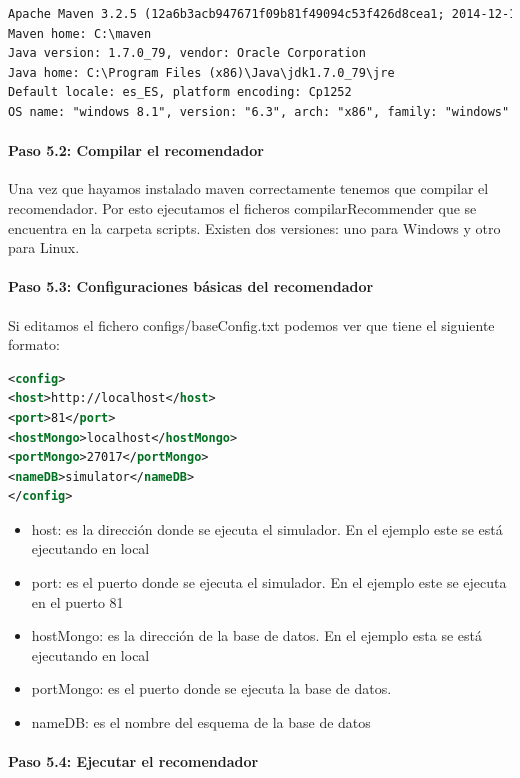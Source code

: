 \begin{lstlisting}[language=xml, frame=single]
Apache Maven 3.2.5 (12a6b3acb947671f09b81f49094c53f426d8cea1; 2014-12-14T18:29:23+01:00)
Maven home: C:\maven
Java version: 1.7.0_79, vendor: Oracle Corporation
Java home: C:\Program Files (x86)\Java\jdk1.7.0_79\jre
Default locale: es_ES, platform encoding: Cp1252
OS name: "windows 8.1", version: "6.3", arch: "x86", family: "windows"
\end{lstlisting}

\paragraph{Paso 5.2: Compilar el recomendador}

Una vez que hayamos instalado maven correctamente tenemos que compilar el recomendador. Por esto ejecutamos el ficheros compilarRecommender que se encuentra en la carpeta scripts. Existen dos versiones: uno para Windows y otro para Linux.

\paragraph{Paso 5.3: Configuraciones básicas del recomendador}

Si editamos el fichero configs/baseConfig.txt podemos ver que tiene el siguiente formato:
\begin{lstlisting}[language=xml, frame=single]
<config>
<host>http://localhost</host>
<port>81</port> 
<hostMongo>localhost</hostMongo>
<portMongo>27017</portMongo> 
<nameDB>simulator</nameDB> 
</config>
\end{lstlisting}

\begin{itemize}
	\item host: es la dirección donde se ejecuta el simulador. En el ejemplo este se está ejecutando en local
	\item port: es el puerto donde se ejecuta el simulador. En el ejemplo este se ejecuta en el puerto 81
	\item hostMongo: es la dirección de la base de datos. En el ejemplo esta se está ejecutando en local
	\item portMongo: es el puerto donde se ejecuta la base de datos.
	\item nameDB: es el nombre del esquema de la base de datos
\end{itemize}

\paragraph{Paso 5.4: Ejecutar el recomendador}

